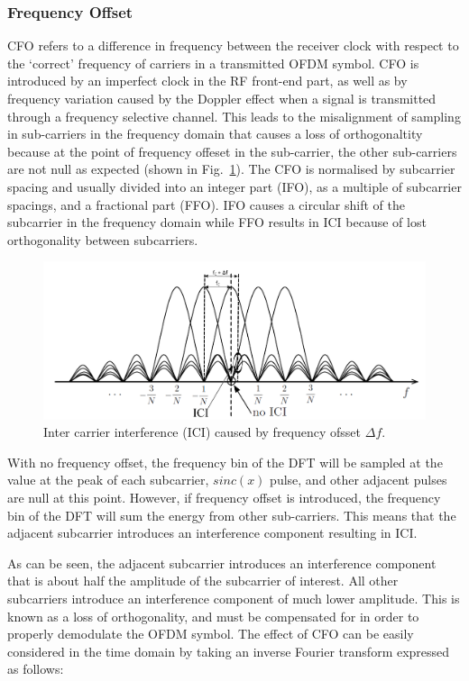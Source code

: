 \subsubsection{Frequency Offset}

CFO refers to a difference in frequency between the receiver clock with respect to the `correct' frequency of carriers in a transmitted OFDM symbol.
CFO is introduced by an imperfect clock in the RF front-end part, as well as by frequency variation caused by the Doppler effect when a signal is transmitted through a frequency selective channel.
This leads to the misalignment of sampling in sub-carriers in the frequency domain that causes a loss of orthogonaltity because at the point of frequency offeset in the sub-carrier, the other sub-carriers are not null as expected (shown in Fig.~\ref{fig:OFDM-subcarrier-freoff}).
The CFO is normalised by subcarrier spacing and usually divided into an integer part (IFO), as a multiple of subcarrier spacings, and a fractional part (FFO).
IFO causes a circular shift of the subcarrier in the frequency domain while FFO results in ICI because of lost orthogonality between subcarriers.

\begin{figure}
	\centerline{\includegraphics [width=0.8\columnwidth] {Figures/OFDM-subcarrier-freoff.pdf} }
	\caption{Inter carrier interference (ICI) caused by frequency ofsset $\Delta f$.}
	\label{fig:OFDM-subcarrier-freoff}
\end{figure}

With no frequency offset, the frequency bin of the DFT will be sampled at the value at the peak of each subcarrier, $sinc(x)$ pulse, and other adjacent pulses are null at this point.
However, if frequency offset is introduced, the frequency bin of the DFT will sum the energy from other sub-carriers.
This means that the adjacent subcarrier introduces an interference component resulting in ICI.

As can be seen, the adjacent subcarrier introduces an interference component that is about half the amplitude of the subcarrier of interest.
All other subcarriers introduce an interference component of much lower amplitude.
This is known as a loss of orthogonality, and must be compensated for in order to properly demodulate the OFDM symbol.
The effect of CFO can be easily considered in the time domain by taking an inverse Fourier transform expressed as follows:

